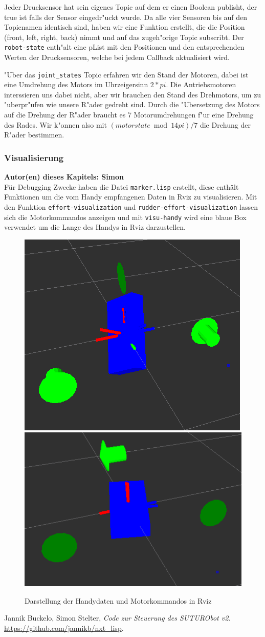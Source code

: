 \documentclass[8pt]{article}
\newcommand{\secauthor}[1]{\textbf{Autor(en) dieses Kapitels: {#1}}\\}
\begin{document}
Jeder Drucksensor hat sein eigenes Topic auf dem er einen Boolean publisht, der true ist falls der Sensor eingedr"uckt wurde. Da alle vier Sensoren bis auf den Topicnamen identisch sind, haben wir eine Funktion erstellt, die die Position (front, left, right, back) nimmt und auf das zugeh"orige Topic subscribt. Der \texttt{robot-state} enth"alt eine pList mit den Positionen und den entsprechenden Werten der Drucksensoren, welche bei jedem Callback aktualisiert wird.

"Uber das \texttt{joint\_states} Topic erfahren wir den Stand der Motoren, dabei ist eine Umdrehung des Motors im Uhrzeigersinn $2*pi$. Die Antriebsmotoren interssieren uns dabei nicht, aber wir brauchen den Stand des Drehmotors, um zu "uberpr"ufen wie unsere R"ader gedreht sind. Durch die "Ubersetzung des Motors auf die Drehung der R"ader braucht es 7 Motorumdrehungen f"ur eine Drehung des Rades. Wir k"onnen also mit 
\( (motorstate \bmod 14pi) / 7 \) die Drehung der R"ader bestimmen.

\subsubsection{Visualisierung} 
\secauthor{Simon}
Für Debugging Zwecke haben die Datei \texttt{marker.lisp} erstellt, diese enthält Funktionen um die vom Handy empfangenen Daten in Rviz zu visualisieren. Mit den Funktion \texttt{effort-visualization} und \texttt{rudder-effort-visualization} lassen sich die Motorkommandos anzeigen und mit \texttt{visu-handy} wird eine blaue Box verwendet um die Lange des Handys in Rviz darzustellen.
\begin{figure}[h]
  \begin{center}
    \includegraphics[width=.4\textwidth]{pictures/rviz2.png}
    \includegraphics[width=.5\textwidth]{pictures/rviz1.png}    
  \end{center}
  \caption{Darstellung der Handydaten und Motorkommandos in Rviz}
  \label{fig:pancake}
\end{figure}

\begin{thebibliography}{9}

  Jannik Buckelo, Simon Stelter,
  \emph{Code zur Steuerung des SUTURObot v2}.
  \url{https://github.com/jannikb/nxt\_lisp}.

\end{thebibliography}
\end{document}
